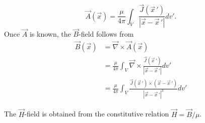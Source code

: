 \documentclass[11pt,a4paper,oneside]{book}
\numberwithin{equation}{section}
\newcommand{\abs}[1]{\left|#1\right|}
\theoremstyle{it}
\theoremstyle{definition}
\begin{document}
\begin{equation}\label{static_5}
\vec{A}(\vec{x}) = \frac{\mu}{4\pi}\int_{V}\frac{\vec{J}(\vec{x}\,')}{\abs{\vec{x}-\vec{x}\,'}}dv'.
\end{equation} 
Once $\vec{A}$ is known, the $\vec{B}$-field follows from
\begin{equation}\label{static_6}
	\begin{aligned}
		\vec{B}(\vec{x})&=\vec{\nabla}\times\vec{A}(\vec{x}) \\[6pt]
	&=\frac{\mu}{4\pi}\int_{V}\vec{\nabla}\times\frac{\vec{J}(\vec{x}\,')}{\abs{\vec{x}-\vec{x}\,'}}dv' \\[6pt]
	&= \frac{\mu}{4\pi}\int_{V}\frac{\vec{J}(\vec{x}\,')\times(\vec{x}-\vec{x}\,')}{\abs{\vec{x}-\vec{x}\,'}^3}dv'
	\end{aligned}
\end{equation} 

The $\vec{H}$-field is obtained from the constitutive relation $\vec{H}=\vec{B}/\mu$. 
\end{document}
